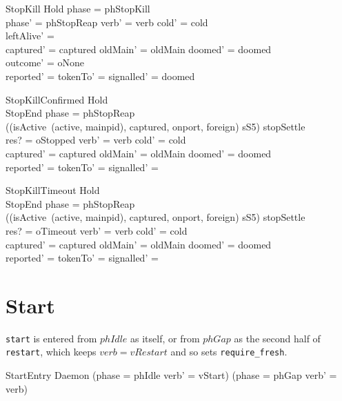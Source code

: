 \documentclass[a4paper,10pt,fleqn]{article}
\begin{document}
\begin{schema}{StopKill}
  Hold
\where
  phase = phStopKill \\
  phase' = phStopReap \land verb' = verb \land cold' = cold \\
  leftAlive' = \emptyset \\
  captured' = captured \land oldMain' = oldMain \land doomed' = doomed \\
  outcome' = oNone \\
  reported' = \emptyset \land tokenTo' = \emptyset \land
    signalled' = doomed
\end{schema}

\begin{schema}{StopKillConfirmed}
  Hold \\
  StopEnd
\where
  phase = phStopReap \\
  ((isActive~(active, mainpid), captured, onport, foreign) \mapsto sS5) \in stopSettle \\
  res? = oStopped \land verb' = verb \land cold' = cold \\
  captured' = captured \land oldMain' = oldMain \land doomed' = doomed \\
  reported' = \emptyset \land tokenTo' = \emptyset \land
    signalled' = \emptyset
\end{schema}

\begin{schema}{StopKillTimeout}
  Hold \\
  StopEnd
\where
  phase = phStopReap \\
  ((isActive~(active, mainpid), captured, onport, foreign) \mapsto sS5) \notin stopSettle \\
  res? = oTimeout \land verb' = verb \land cold' = cold \\
  captured' = captured \land oldMain' = oldMain \land doomed' = doomed \\
  reported' = \emptyset \land tokenTo' = \emptyset \land
    signalled' = \emptyset
\end{schema}

\section{Start}

\texttt{start} is entered from $phIdle$ as itself, or from $phGap$ as the
second half of \texttt{restart}, which keeps $verb = vRestart$ and so sets
\texttt{require\_fresh}.

\begin{schema}{StartEntry}
  \Delta Daemon
\where
  (phase = phIdle \land verb' = vStart) \lor
    (phase = phGap \land verb' = verb)
\end{schema}
\end{document}

